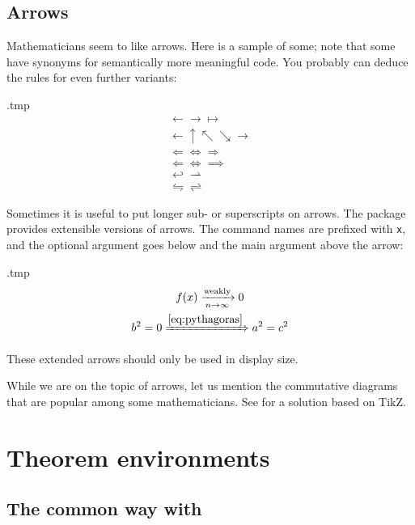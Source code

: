 \subsection{Arrows}
Mathematicians seem to like arrows.
Here is a sample of some;
note that some have synonyms for semantically more meaningful code.
You probably can deduce the rules for even further variants:
\begin{VerbatimOut}{\jobname.tmp}
\begin{gather*}
\gets \to \mapsto\\
\leftarrow \uparrow \nwarrow \searrow \rightarrow\\
\Leftarrow \Leftrightarrow \Rightarrow\\
\Longleftarrow \Longleftrightarrow \implies\\
\hookleftarrow \rightharpoonup\\
\leftrightharpoons \rightleftharpoons
\end{gather*}
\end{VerbatimOut}
\ShowExample

Sometimes it is useful to put longer sub- or superscripts on arrows.
The  package provides extensible versions of arrows.
The command names are prefixed with \verb|x|,
and the optional argument goes below and the main argument above the arrow:
%
\begin{VerbatimOut}{\jobname.tmp}
\begin{gather*}
f(x) \xrightarrow[n \to \infty]{\text{weakly}} 0\\
b^2 = 0
\xRightarrow{\eqref{eq:pythagoras}} a^2 = c^2
\end{gather*}
\end{VerbatimOut}
\ShowExample

\begin{gotcha}
These extended arrows should only be used in display size.
\end{gotcha}

While we are on the topic of arrows,
let us mention the commutative diagrams that are popular among some mathematicians.
See  for a solution based on TikZ.



%
%
%
\section{Theorem environments}

\subsection{The common way with }\label{sec:amsthm}


